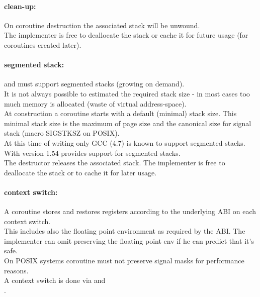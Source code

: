 \paragraph*{clean-up:}
On coroutine destruction the associated stack will be unwound.\\
\newline
The implementer is free to deallocate the stack or cache it for future usage
(for coroutines created later).

\paragraph*{segmented stack:}
\pushcoro and \pullcoro must support segmented stacks (growing on demand).\\
\newline
It is not always possible to estimated the required stack size - in most cases
too much memory is allocated (waste of virtual address-space).\\
\newline
At construction a coroutine starts with a default (minimal) stack size. This
minimal stack size is the maximum of page size and the canonical size for signal
stack (macro SIGSTKSZ on POSIX).\\
\newline
At this time of writing only GCC (4.7)\cite{gccsplit} is known to support
segmented stacks. With version 1.54 \boostcoroutine provides support for
segmented stacks.\\
\newline
The destructor releases the associated stack. The implementer is free to
deallocate the stack or to cache it for later usage.

\paragraph*{context switch:}
A coroutine stores and restores registers according to the underlying ABI on
each context switch.\\
\newline
This includes also the floating point environment as required by the ABI. The
implementer can omit preserving the floating point env if he can predict that
it's safe.\\
\newline
On POSIX systems coroutine must not preserve signal masks for performance
reasons.\\
\newline
A context switch is done via \pushcoroop and\\
\pullcoroop.

